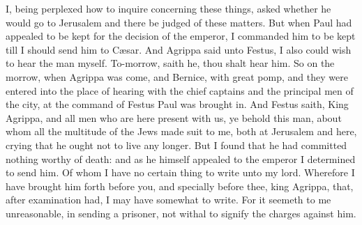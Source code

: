 I, being perplexed how to inquire concerning these things, asked whether he would go to Jerusalem and there be judged of these matters. But when Paul had appealed to be kept for the decision of the emperor, I commanded him to be kept till I should send him to Cæsar. And Agrippa said unto Festus, I also could wish to hear the man myself. To-morrow, saith he, thou shalt hear him.  So on the morrow, when Agrippa was come, and Bernice, with great pomp, and they were entered into the place of hearing with the chief captains and the principal men of the city, at the command of Festus Paul was brought in. And Festus saith, King Agrippa, and all men who are here present with us, ye behold this man, about whom all the multitude of the Jews made suit to me, both at Jerusalem and here, crying that he ought not to live any longer. But I found that he had committed nothing worthy of death: and as he himself appealed to the emperor I determined to send him. Of whom I have no certain thing to write unto my lord. Wherefore I have brought him forth before you, and specially before thee, king Agrippa, that, after examination had, I may have somewhat to write. For it seemeth to me unreasonable, in sending a prisoner, not withal to signify the charges against him. 

